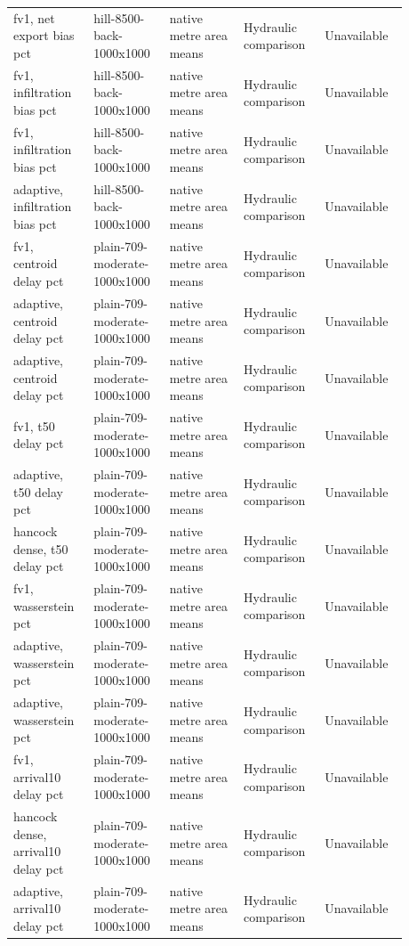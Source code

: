 \begin{longtable}{p{0.1760\linewidth}p{0.1760\linewidth}p{0.1760\linewidth}p{0.1760\linewidth}p{0.1760\linewidth}}
fv1, net export bias pct & hill-8500-back-1000x1000 & native metre area means & Hydraulic comparison & Unavailable \\
fv1, infiltration bias pct & hill-8500-back-1000x1000 & native metre area means & Hydraulic comparison & Unavailable \\
fv1, infiltration bias pct & hill-8500-back-1000x1000 & native metre area means & Hydraulic comparison & Unavailable \\
adaptive, infiltration bias pct & hill-8500-back-1000x1000 & native metre area means & Hydraulic comparison & Unavailable \\
fv1, centroid delay pct & plain-709-moderate-1000x1000 & native metre area means & Hydraulic comparison & Unavailable \\
adaptive, centroid delay pct & plain-709-moderate-1000x1000 & native metre area means & Hydraulic comparison & Unavailable \\
adaptive, centroid delay pct & plain-709-moderate-1000x1000 & native metre area means & Hydraulic comparison & Unavailable \\
fv1, t50 delay pct & plain-709-moderate-1000x1000 & native metre area means & Hydraulic comparison & Unavailable \\
adaptive, t50 delay pct & plain-709-moderate-1000x1000 & native metre area means & Hydraulic comparison & Unavailable \\
hancock dense, t50 delay pct & plain-709-moderate-1000x1000 & native metre area means & Hydraulic comparison & Unavailable \\
fv1, wasserstein pct & plain-709-moderate-1000x1000 & native metre area means & Hydraulic comparison & Unavailable \\
adaptive, wasserstein pct & plain-709-moderate-1000x1000 & native metre area means & Hydraulic comparison & Unavailable \\
adaptive, wasserstein pct & plain-709-moderate-1000x1000 & native metre area means & Hydraulic comparison & Unavailable \\
fv1, arrival10 delay pct & plain-709-moderate-1000x1000 & native metre area means & Hydraulic comparison & Unavailable \\
hancock dense, arrival10 delay pct & plain-709-moderate-1000x1000 & native metre area means & Hydraulic comparison & Unavailable \\
adaptive, arrival10 delay pct & plain-709-moderate-1000x1000 & native metre area means & Hydraulic comparison & Unavailable \\

\end{longtable}
